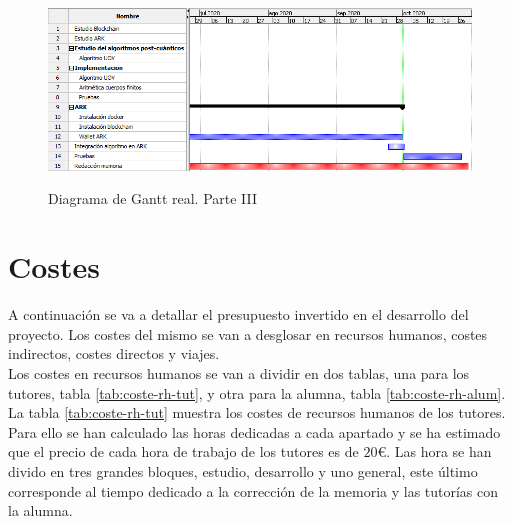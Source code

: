 \begin{figure}[H]
	\centering
	\includegraphics[width=13cm,height=5cm]{figuras/Gantt_3.png}
	\caption{Diagrama de Gantt real. Parte III}
	\label{fig:gantt-real-3}
\end{figure}


\section{Costes}

A continuación se va a detallar el presupuesto invertido en el desarrollo del proyecto. Los costes del mismo se van a desglosar en recursos humanos, costes indirectos, costes directos y viajes.\\



Los costes en recursos humanos se van a dividir en dos tablas, una para los tutores, tabla \ref{tab:coste-rh-tut}, y otra para la alumna, tabla \ref{tab:coste-rh-alum}.\\

La tabla \ref{tab:coste-rh-tut} muestra los costes de recursos humanos de los tutores. Para ello se han calculado las horas dedicadas a cada apartado y se ha estimado que el precio de cada hora de trabajo de los tutores es de $20$\euro. Las hora se han divido en tres grandes bloques, estudio, desarrollo y uno general, este último corresponde al tiempo dedicado a la corrección de la memoria y las tutorías con la alumna.\\



